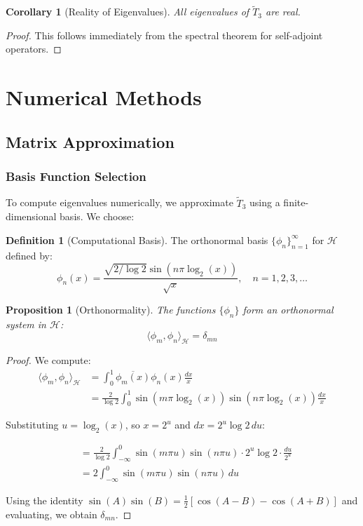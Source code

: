 \documentclass[12pt,letterpaper]{article}
\theoremstyle{plain}
\newtheorem{proposition}[theorem]{Proposition}
\newtheorem{corollary}[theorem]{Corollary}
\theoremstyle{definition}
\newtheorem{definition}[theorem]{Definition}
\theoremstyle{remark}
\newcommand{\inner}[2]{\langle #1, #2 \rangle}
\newcommand{\hilbert}{\mathcal{H}}
\newcommand{\modifiedop}{\tilde{T}_3}
\newcommand{\conj}[1]{\overline{#1}}
\begin{document}
\begin{corollary}[Reality of Eigenvalues]\label{cor:real_eigenvalues}
All eigenvalues of $\modifiedop$ are real.
\end{corollary}

\begin{proof}
This follows immediately from the spectral theorem for self-adjoint operators.
\end{proof}

\section{Numerical Methods}

\subsection{Matrix Approximation}

\subsubsection{Basis Function Selection}

To compute eigenvalues numerically, we approximate $\modifiedop$ using a finite-dimensional basis. We choose:

\begin{definition}[Computational Basis]\label{def:basis}
The orthonormal basis $\{\phi_n\}_{n=1}^{\infty}$ for $\hilbert$ defined by:
\begin{equation}
\phi_n(x) = \frac{\sqrt{2/\log 2} \sin(n\pi\log_2(x))}{\sqrt{x}}, \quad n = 1, 2, 3, \ldots
\end{equation}
\end{definition}

\begin{proposition}[Orthonormality]\label{prop:orthonormal}
The functions $\{\phi_n\}$ form an orthonormal system in $\hilbert$:
\begin{equation}
\inner{\phi_m}{\phi_n}_{\hilbert} = \delta_{mn}
\end{equation}
\end{proposition}

\begin{proof}
We compute:
\begin{align}
\inner{\phi_m}{\phi_n}_{\hilbert} &= \int_0^1 \conj{\phi_m(x)} \phi_n(x) \frac{dx}{x}\\
&= \frac{2}{\log 2} \int_0^1 \sin(m\pi\log_2(x)) \sin(n\pi\log_2(x)) \frac{dx}{x}
\end{align}

Substituting $u = \log_2(x)$, so $x = 2^u$ and $dx = 2^u \log 2 \, du$:

\begin{align}
&= \frac{2}{\log 2} \int_{-\infty}^0 \sin(m\pi u) \sin(n\pi u) \cdot 2^u \log 2 \cdot \frac{du}{2^u}\\
&= 2 \int_{-\infty}^0 \sin(m\pi u) \sin(n\pi u) \, du
\end{align}

Using the identity $\sin(A)\sin(B) = \frac{1}{2}[\cos(A-B) - \cos(A+B)]$ and evaluating, we obtain $\delta_{mn}$.
\end{proof}
\end{document}

